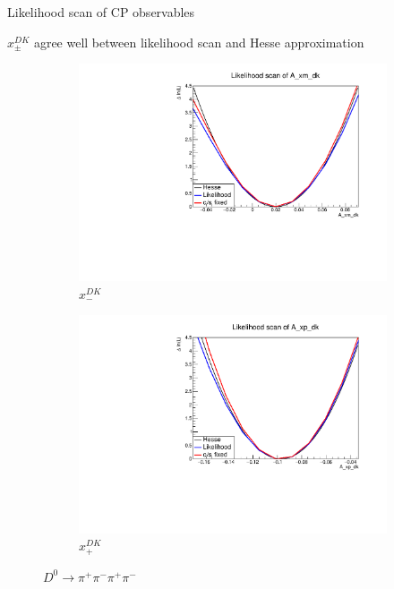 \documentclass[xcolor={dvipsnames}]{beamer}
\begin{document}
\begin{frame}{Likelihood scan of CP observables}
  \begin{center}
    $x_\pm^{DK}$ agree well between likelihood scan and Hesse approximation
  \end{center}
  \begin{figure}
    \centering
    \begin{subfigure}{0.5\textwidth}
      \centering
      \includegraphics[width=1.0\textwidth]{Plots/A_xm_dk_likelihood_scan_pipipipi.pdf}
      \vspace{-0.3cm}
      \caption*{$x_-^{DK}$}
    \end{subfigure}%
    \begin{subfigure}{0.5\textwidth}
      \centering
      \includegraphics[width=1.0\textwidth]{Plots/A_xp_dk_likelihood_scan_pipipipi.pdf}
      \vspace{-0.3cm}
      \caption*{$x_+^{DK}$}
    \end{subfigure}
    \caption*{$D^0\to\pi^+\pi^-\pi^+\pi^-$}
  \end{figure}
\end{frame}
\end{document}
